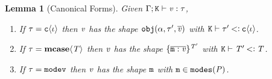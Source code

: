 \documentclass[onecolumn,nocopyrightspace]{sigplanconf}
\newtheorem{lemma}{Lemma}
\theoremstyle{lessintrusive}
\theoremstyle{plain}
\theoremstyle{custom}
\theoremstyle{subcase-custom}
\begin{document}
\begin{lemma}[Canonical Forms]
\label{pf:canonical-forms}
Given $\Gamma;\mathtt{K}\vdash\mathit{v}:\tau$,
\leavevmode
\begin{enumerate}[(\arabic*)] 

\item If $\tau = \mathtt{c}\langle\iota\rangle$ then $\mathit{v}$ has the shape $\mathtt{obj}(\alpha,\tau',\overline{\mathit{v}})$ with $\mathtt{K}\vdash\tau'\mathbin{<\vcentcolon}\mathtt{c}\langle\iota\rangle$.

\item If $\tau = \texttt{\bf mcase}\langle\mathit{T}\rangle$ then $\mathit{v}$ has the shape $\{\overline{\mathtt{m} : \mathit{v}}\}^{\mathit{T}'}$ with $\mathtt{K}\vdash\mathit{T}'\mathbin{<\vcentcolon}\mathit{T}$.

\item If $\tau = \mathtt{modev}$ then $\mathit{v}$ has the shape $\mathtt{m}$ with $\mathtt{m} \in \mathtt{modes}(\mathit{P})$.

\end{enumerate}
\end{lemma}
\end{document}
